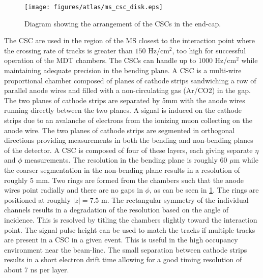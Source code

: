 \begin{figure}[ht]
\centering
\texttt{[image: figures/atlas/ms\_csc\_disk.eps]}
\caption{Diagram showing the arrangement of the CSCs in the end-cap.}
\label{fig:atlas_ms_csc_disk}
\end{figure}


The CSC are used in the region of the MS closest to the interaction
point where the crossing rate of tracks 
is greater than $150$ Hz/cm$^2$, 
too high for successful operation of the MDT chambers.
The CSCs can handle up to 1000 Hz/cm$^2$
while maintaining adequate  precision in the bending plane.
A CSC is a multi-wire proportional chamber
composed of planes of cathode strips sandwiching 
a row of parallel anode wires and filled with a non-circulating gas (Ar/CO2)
in the gap.
The two planes of cathode strips are separated by 5mm
with the anode wires running directly between the two planes.
A signal is induced on the cathode strips due to an avalanche
of electrons from the ionizing muon collecting on the anode wire.
The two planes of cathode strips are segmented in orthogonal directions
providing measurements in both the bending and non-bending planes of the detector. 
A CSC is composed of four of these layers, each giving separate $\eta$ and
$\phi$ measurements.
The resolution in the bending plane is roughly 60 $\mu$m
while the coarser segmentation in the non-bending plane 
results in a  resolution of  roughly 5 mm.
Two rings are formed from the chambers such that the anode wires
point radially and there are no gaps in $\phi$, as
can be seen in \fig\ref{fig:atlas_ms_csc_disk}. The rings are positioned
at roughly $|z|=7.5$ m. The rectangular symmetry of the individual channels
results in a degradation of the resolution based on the angle of incidence.
This is resolved by titling the chambers slightly toward the interaction point.
The signal pulse height can be used to match the tracks
if multiple tracks are present in a CSC in a given event. This 
is useful in the high occupancy environment near the beam-line.
The small separation between cathode strips results in 
a short electron drift time allowing for a good
timing resolution of about 7 ns per layer.

